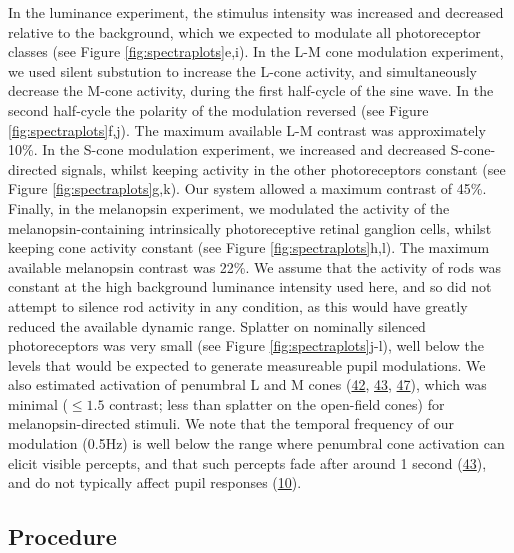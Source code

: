\documentclass[
]{article}
\begin{document}
In the luminance experiment, the stimulus intensity was increased and decreased relative to the background, which we expected to modulate all photoreceptor classes (see Figure \ref{fig:spectraplots}e,i). In the L-M cone modulation experiment, we used silent substution to increase the L-cone activity, and simultaneously decrease the M-cone activity, during the first half-cycle of the sine wave. In the second half-cycle the polarity of the modulation reversed (see Figure \ref{fig:spectraplots}f,j). The maximum available L-M contrast was approximately 10\%. In the S-cone modulation experiment, we increased and decreased S-cone-directed signals, whilst keeping activity in the other photoreceptors constant (see Figure \ref{fig:spectraplots}g,k). Our system allowed a maximum contrast of 45\%. Finally, in the melanopsin experiment, we modulated the activity of the melanopsin-containing intrinsically photoreceptive retinal ganglion cells, whilst keeping cone activity constant (see Figure \ref{fig:spectraplots}h,l). The maximum available melanopsin contrast was 22\%. We assume that the activity of rods was constant at the high background luminance intensity used here, and so did not attempt to silence rod activity in any condition, as this would have greatly reduced the available dynamic range. Splatter on nominally silenced photoreceptors was very small (see Figure \ref{fig:spectraplots}j-l), well below the levels that would be expected to generate measureable pupil modulations. We also estimated activation of penumbral L and M cones (\protect\hyperlink{ref-Barrionuevo2016}{42}, \protect\hyperlink{ref-Spitschan2015}{43}, \protect\hyperlink{ref-Zele2019}{47}), which was minimal (\(\le 1.5%
\) contrast; less than splatter on the open-field cones) for melanopsin-directed stimuli. We note that the temporal frequency of our modulation (0.5Hz) is well below the range where penumbral cone activation can elicit visible percepts, and that such percepts fade after around 1 second (\protect\hyperlink{ref-Spitschan2015}{43}), and do not typically affect pupil responses (\protect\hyperlink{ref-Spitschan2014}{10}).

\hypertarget{procedure}{%
\subsection{Procedure}\label{procedure}}
\end{document}
